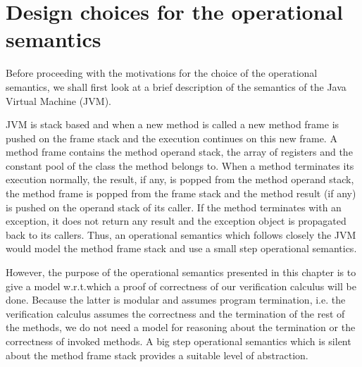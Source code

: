 
\section{Design choices for the operational semantics}\label{opSem:JVM}


 Before proceeding with the motivations for the choice of the operational semantics,
 we shall first look at a brief description of the semantics of the Java Virtual Machine (JVM).

 JVM is stack based and when a new method is called a new method frame is pushed on the frame stack and the execution continues on this new frame.
 A method frame contains the method operand stack, the array of registers and the constant pool of the class the method belongs to.
 When a method terminates its execution normally, the result, if any, is popped from the method operand stack, the method frame is
 popped from the frame stack and the method result (if any) is pushed on the operand stack
 of its caller. If the method terminates with an exception, it does not return any result and the exception object is propagated back to its callers.
 Thus, an operational semantics which  follows closely the JVM would model the method frame stack and use a small step operational semantics. 
 
 However, the purpose of the operational semantics presented in this chapter is to give
 a model w.r.t.which a proof of correctness of our verification calculus will be done. Because the latter
 is modular and assumes program termination,
 i.e. the verification calculus assumes the correctness and the termination of the rest of the methods,
 we do not need a model for reasoning about the termination or the correctness of invoked methods.
 A big step operational semantics which is silent about the method frame stack
 provides a suitable level of abstraction.
 

 

 

